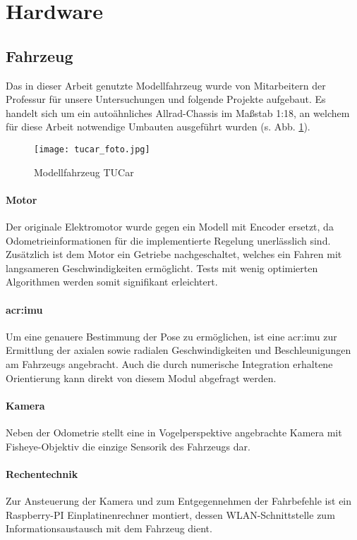 \section{Hardware \dcsecondauthorshort}
\subsection{Fahrzeug}
Das in dieser Arbeit genutzte Modellfahrzeug wurde von Mitarbeitern der Professur für unsere Untersuchungen und folgende Projekte aufgebaut. Es handelt sich um ein autoähnliches Allrad-Chassis im Maßstab 1:18, an welchem für diese Arbeit notwendige Umbauten ausgeführt wurden (s. Abb. \ref{fig:tucar_foto}).
\begin{figure}[htbp] %
	\centering
	\texttt{[image: tucar\_foto.jpg]}
	\caption{Modellfahrzeug \glqq TUCar \grqq}
	\label{fig:tucar_foto}
\end{figure}
\paragraph{Motor}
Der originale Elektromotor wurde gegen ein Modell mit Encoder ersetzt, da Odometrieinformationen für die implementierte Regelung unerlässlich sind. Zusätzlich ist dem Motor ein Getriebe nachgeschaltet, welches ein Fahren mit langsameren Geschwindigkeiten ermöglicht. Tests mit wenig optimierten Algorithmen werden somit signifikant erleichtert.
\paragraph{\gls{acr:imu}}
Um eine genauere Bestimmung der Pose zu ermöglichen, ist eine \gls{acr:imu} zur Ermittlung der axialen sowie radialen Geschwindigkeiten und Beschleunigungen am Fahrzeugs angebracht. Auch die durch numerische Integration erhaltene Orientierung kann direkt von diesem Modul abgefragt werden. 
\paragraph{Kamera}
Neben der Odometrie stellt eine in Vogelperspektive angebrachte Kamera mit Fisheye-Objektiv die einzige Sensorik des Fahrzeugs dar.
\paragraph{Rechentechnik}
Zur Ansteuerung der Kamera und zum Entgegennehmen der Fahrbefehle ist ein Raspberry-PI Einplatinenrechner montiert, dessen WLAN-Schnittstelle zum Informationsaustausch mit dem Fahrzeug dient.
